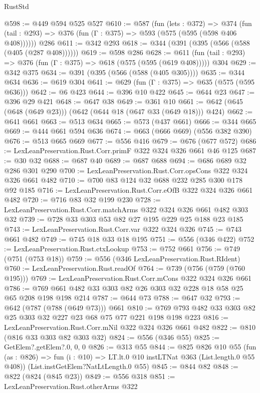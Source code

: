 \begin{lexlean}{RustStd}
\begin{coremodule}
@598 := @449 @594 @525 @527
@610 := @587
    (fun (lets : @372) =>
    @374 (fun (tail : @293) => @376 (fun (Γ : @375) => @593 (@575 (@595 (@598 @406 @408))))))
    @286
@611 := @342 @293
@618 := @344 (@391 (@395 (@566 (@588 (@405 (@287 @408))))))
@619 := @598 @286
@628 := @611 (fun (tail : @293) => @376 (fun (Γ : @375) => @618 (@575 (@595 (@619 @408))))) @304
@629 := @342 @375
@634 := @391 (@395 (@566 (@588 (@405 @305))))
@635 := @344 @634
@636 := @619 @304
@641 := @629 (fun (Γ : @375) => @635 (@575 (@595 @636)))
@642 := @6 @423
@644 := @396 @10 @422
@645 := @644 @23
@647 := @396 @29 @421
@648 := @647 @38
@649 := @361 @10
@661 := @642 (@645 (@648 (@649 @23))) (@642 (@644 @18 (@647 @33 (@649 @18))) @424)
@662 := @641 @661
@663 := @513 @634
@665 := @573 (@437 @661)
@666 := @344 @665
@669 := @444 @661 @594 @636
@674 := @663 (@666 @669) (@556 @382 @390)
@676 := @513 @665 @669
@677 := @556 @416
@679 := @676 (@677 @572)
@686 := LexLeanPreservation.Rust.Corr.primF @322 @324 @326 @661 @46 @125
@687 := @30 @32
@688 := @687 @40
@689 := @687 @688
@694 := @686 @689 @32 @286 @301 @290
@700 := LexLeanPreservation.Rust.Corr.opsCons @322 @324 @326 @661 @482
@710 := @700 @83 @124 @32 @688 @232 @285 @300 @178 @92 @185
@716 := LexLeanPreservation.Rust.Corr.eOfB @322 @324 @326 @661 @482
@720 := @716 @83 @32 @199 @230
@728 := LexLeanPreservation.Rust.Corr.matchArms @322 @324 @326 @661 @482 @303 @32
@739 := @728 @33 @303 @53 @82 @27 @195 @229 @25 @188 @23 @185
@743 := LexLeanPreservation.Rust.Corr.var @322 @324 @326
@745 := @743 @661 @482
@749 := @745 @18 @33 @18 @195
@751 := @556 (@346 @422)
@752 := LexLeanPreservation.Rust.ctxLookup
@753 := @752 @661
@756 := @749 (@751 (@753 @18))
@759 := @556 (@346 LexLeanPreservation.Rust.RIdent)
@760 := LexLeanPreservation.Rust.readOf
@764 := @739 (@756 (@759 (@760 @195)))
@769 := LexLeanPreservation.Rust.Corr.mCons @322 @324 @326 @661
@786 := @769 @661 @482 @33 @303 @82 @26 @303 @32 @228 @18 @58 @25 @65 @208 @198 @198 @214
@787 := @644 @73
@788 := @647 @32
@793 := @642 (@787 (@788 (@649 @73))) @661
@810 := @769 @793 @482 @33 @303 @82 @25 @303 @32 @227 @23 @68 @75 @77 @221 @198 @198 @223
@816 := LexLeanPreservation.Rust.Corr.mNil @322 @324 @326 @661 @482
@822 := @810 (@816 @33 @303 @82 @303 @32)
@824 := @556 (@346 @55)
@825 := GetElem?.getElem?.{0, 0, 0}
@826 := @313 @55
@844 := @825
    @826
    @10
    @55
    (fun (as : @826) => fun (i : @10) => LT.lt.{0} @10 instLTNat @363 (List.length.{0} @55 @408))
    (List.instGetElem?NatLtLength.{0} @55)
@845 := @844 @82
@848 := @822 (@824 (@845 @23))
@849 := @556 @318
@851 := LexLeanPreservation.Rust.otherArms @322

\end{coremodule}
\end{lexlean}
